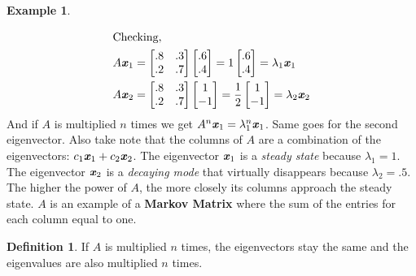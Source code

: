 \documentclass[12pt, letterpaper]{article}
\newcommand{\V}[1]{\textbf{\textit{#1}}}
\newcommand{\DefinitionSpace}{\vspace{15px}}
\theoremstyle{definition}
\newtheorem{definition}{Definition}[section]
\newtheorem{example}{Example}
\begin{document}
\begin{example}
\begin{align*}
		\end{align*}
		\begin{align*}
			\intertext{Checking,}
			A \V{x}_1 &= \begin{bmatrix}
							.8 & .3 \\
							.2 & .7
							\end{bmatrix} \begin{bmatrix}
												.6 \\ .4
												\end{bmatrix} = 1 \begin{bmatrix}
																	.6 \\ .4
																	\end{bmatrix} = \lambda_1 \V{x}_1\\
			A \V{x}_2 &= \begin{bmatrix}
								.8 & .3 \\
								.2 & .7
								\end{bmatrix} \begin{bmatrix}
													1 \\  -1
													\end{bmatrix} = \frac{1}{2} \begin{bmatrix}
																					1 \\ -1
																					\end{bmatrix} = \lambda_2 \V{x}_2			
		\end{align*}
		And if $A$ is multiplied $n$ times we get $A^n \V{x}_1 = \lambda_1^n\V{x}_1$. Same goes for the second eigenvector. Also take note that the columns of $A$ are a combination of the eigenvectors: $c_1\V{x}_1 + c_2\V{x}_2$. The eigenvector $\V{x}_1$ is a \textit{steady state} because $\lambda_1 = 1$. The eigenvector $\V{x}_2$ is a \textit{decaying mode} that virtually disappears because $\lambda_2=.5$. The higher the power of $A$, the more closely its columns approach the steady state. $A$ is an example of a \textbf{Markov Matrix} where the sum of the entries for each column equal to one.
	\end{example}
	\DefinitionSpace
	
		\begin{definition}
			If $A$ is multiplied $n$ times, the eigenvectors stay the same and the eigenvalues are also multiplied $n$ times.
		\end{definition}
\end{document}
